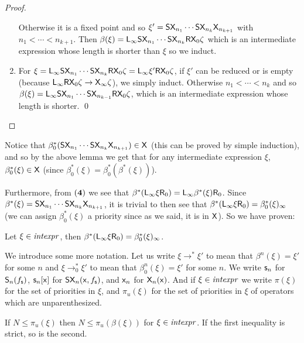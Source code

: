 \documentclass{llncs}
\begin{document}
\begin{proof}
\begin{enumerate}
        Otherwise it is a fixed point and so $\xi'=\mathsf{S}\mathsf{X}_{n_1}\cdots\mathsf{S}\mathsf{X}_{n_k}\mathsf{X}_{n_{k+1}}$ with $n_1<\cdots<n_{k+1}$.
        Then $\beta(\xi)=\mathsf{L}_\infty\mathsf{S}\mathsf{X}_{n_1}\cdots\mathsf{S}\mathsf{X}_{n_k}\mathsf{R}\mathsf{X}_0\zeta$ which is an intermediate expression whose length is shorter than $\xi$ so we induct.
        \item For $\xi=\mathsf{L}_\infty\mathsf{S}\mathsf{X}_{n_1}\cdots\mathsf{S}\mathsf{X}_{n_k}\mathsf{R}\mathsf{X}_0\zeta=\mathsf{L}_\infty\xi'\mathsf{R}\mathsf{X}_0\zeta$, if $\xi'$ can be reduced or is empty
        (because $\mathsf{L}_\infty\mathsf{R}\mathsf{X}_0\zeta\to\mathsf{X}_\infty\zeta$), we simply induct.
        Otherwise $n_1<\cdots<n_k$ and so $\beta(\xi)=\mathsf{L}_\infty\mathsf{S}\mathsf{X}_{n_1}\cdots\mathsf{S}\mathsf{X}_{n_{k-1}}\mathsf{R}\mathsf{X}_0\zeta$, which is an intermediate expression whose length is shorter.
        \qed
    \end{enumerate}

\end{proof}

Notice that $\beta^*_0(\mathsf{S}\mathsf{X}_{n_1}\cdots\mathsf{S}\mathsf{X}_{n_k}\mathsf{X}_{n_{k+1}})\in\mathsf{X}$ (this can be proved by simple induction), and so by the above lemma we get that for any intermediate expression $\xi$,
$\beta^*_0(\xi)\in\mathsf{X}$ (since $\beta^*_0(\xi)=\beta^*_0(\beta^*(\xi))$).

Furthermore, from $({\bf4})$ we see that $\beta^*(\mathsf{L}_\infty\xi\mathsf{R}_0)=\mathsf{L}_\infty\beta^*(\xi)\mathsf{R}_0$.
Since $\beta^*(\xi)=\mathsf{S}\mathsf{X}_{n_1}\cdots\mathsf{S}\mathsf{X}_{n_k}\mathsf{X}_{n_{k+1}}$, it is trivial to then see that $\beta^*(\mathsf{L}_\infty\xi\mathsf{R}_0)=\beta^*_0(\xi)_\infty$ (we can assign $\beta^*_0(\xi)$ a priority
since as we said, it is in $\mathsf{X}$).
So we have proven:

\begin{lemma}

    Let $\xi\in{\it intexpr}$, then $\beta^*(\mathsf{L}_\infty\xi\mathsf{R}_0)=\beta^*_0(\xi)_\infty$.

\end{lemma}

We introduce some more notation.
Let us write $\xi\to^*\xi'$ to mean that $\beta^n(\xi)=\xi'$ for some $n$ and $\xi\to^*_0\xi'$ to mean that $\beta^n_0(\xi)=\xi'$ for some $n$.
We write $\mathsf{s}_n$ for $\mathsf{S}_n(f_{\mathsf{s}})$, $\mathsf{s}_n[\mathsf{x}]$ for $\mathsf{S}\mathsf{X}_n(\mathsf{x},f_{\mathsf{s}})$, and $\mathsf{x}_n$ for $\mathsf{X}_n(\mathsf{x})$.
And if $\xi\in{\it intexpr}$ we write $\pi(\xi)$ for the set of priorities in $\xi$, and $\pi_u(\xi)$ for the set of priorities in $\xi$ of operators which are unparenthesized.

\begin{lemma}

    If $N\leq\pi_u(\xi)$ then $N\leq\pi_u(\beta(\xi))$ for $\xi\in{\it intexpr}$.
    If the first inequality is strict, so is the second.

\end{lemma}
\end{document}
